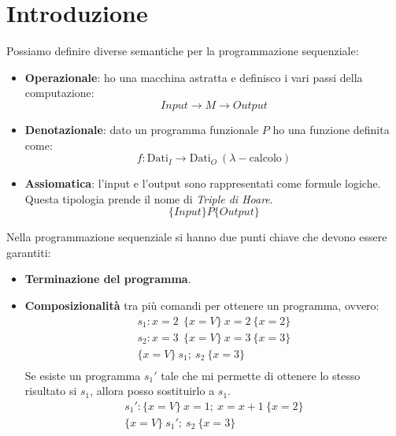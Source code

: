 \chapter{Introduzione}
Possiamo definire diverse semantiche per la programmazione sequenziale:
\begin{itemize}
    \item \textbf{Operazionale}: ho una macchina astratta e definisco i vari passi
          della computazione:
          \begin{equation}
              Input \longrightarrow M \longrightarrow Output
          \end{equation}
    \item \textbf{Denotazionale}: dato un programma funzionale $P$ ho una funzione
          definita come:
          \begin{equation}
              f: \text{Dati}_{I} \to \text{Dati}_{O} \ ( \lambda-\text{calcolo})
          \end{equation}
    \item \textbf{Assiomatica}: l'input e l'output sono rappresentati come formule
          logiche. Questa tipologia prende il nome di \textit{Triple di Hoare}.
          \begin{equation}
              \{Input\} P \{Output\}
          \end{equation}
\end{itemize}
Nella programmazione sequenziale si hanno due punti chiave che devono essere garantiti:
\begin{itemize}
    \item \textbf{Terminazione del programma}.
    \item \textbf{Composizionalità} tra più comandi per ottenere un programma, ovvero:
          \begin{equation}
              \begin{aligned}
                  s_1: x = 2 \ \ \{x = V\} \ x = 2 \ \{x = 2\} \\
                  s_2: x = 3 \ \ \{x = V\} \ x = 3 \ \{x = 3\} \\
                  \{x = V\} \ s_1; \ s_2 \ \{x = 3\}           \\
              \end{aligned}
          \end{equation}
          Se esiste un programma $s_1'$ tale che mi permette di ottenere lo stesso
          risultato si $s_1$, allora posso sostituirlo a $s_1$.
          \begin{equation}
              \begin{aligned}
                  s_1': \{x = V\} \ x = 1; \ x = x + 1  \ \{x = 2\} \\
                  \{x = V\} \ s_1'; \ s_2 \ \{x = 3\}               \\
              \end{aligned}
          \end{equation}
\end{itemize}

